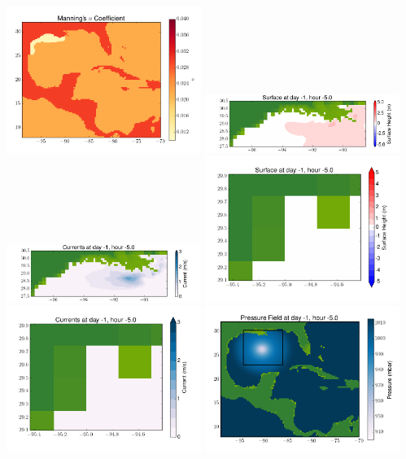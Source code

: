 \documentclass[11pt]{article}
\begin{document}
\vskip 10pt 
\includegraphics[width=0.475\textwidth]{frame0043fig3.png}
\includegraphics[width=0.475\textwidth]{frame0043fig4.png}
\vskip 10pt 
\includegraphics[width=0.475\textwidth]{frame0043fig5.png}
\includegraphics[width=0.475\textwidth]{frame0043fig6.png}
\vskip 10pt 
\includegraphics[width=0.475\textwidth]{frame0043fig7.png}
\includegraphics[width=0.475\textwidth]{frame0043fig8.png}
\end{document}
